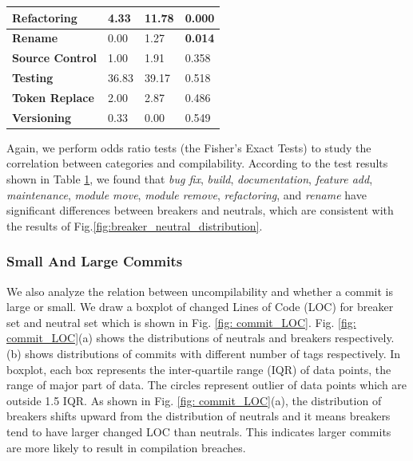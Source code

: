 \begin{table}[htbp]
\begin{tabular}{llll}
      \hline
      \textbf{Refactoring} & 4.33  & 11.78  & \textbf{0.000} \\
      \hline
      \textbf{Rename} & 0.00  & 1.27  & \textbf{0.014} \\
      \hline
      \textbf{Source Control} & 1.00  & 1.91  & 0.358  \\
      \hline
      \textbf{Testing} & 36.83  & 39.17  & 0.518  \\
      \hline
      \textbf{Token Replace} & 2.00  & 2.87  & 0.486  \\
      \hline
      \textbf{Versioning} & 0.33  & 0.00  & 0.549  \\
      \hline
      \end{tabular}%
    \label{tab:breaker_neutral}%
  \end{table}%

Again, we perform odds ratio tests (the Fisher's Exact Tests) to study the correlation between categories and compilability. 
According to the test results shown in Table \ref{tab:breaker_neutral}, we found that \textit{bug fix}, \textit{build}, \textit{documentation}, \textit{feature add}, \textit{maintenance}, \textit{module move}, \textit{module remove}, \textit{refactoring}, and \textit{rename} have significant differences between breaker{}s and neutral{}s, which are consistent with the results of Fig.\ref{fig:breaker_neutral_distribution}.

\subsubsection{Small And Large Commits}

We also analyze the relation between uncompilability and whether a commit is large or small. 
We draw a boxplot of changed Lines of Code (LOC) for breaker set and neutral set which is shown in Fig. \ref{fig: commit_LOC}.
Fig. \ref{fig: commit_LOC}(a) shows the distributions of neutrals and breakers respectively. 
(b) shows distributions of commits with different number of tags respectively. 
In boxplot, each box represents the inter-quartile range (IQR) of data points, the range of major part of data.
The circles represent outlier of data points which are outside 1.5 IQR.
As shown in Fig. \ref{fig: commit_LOC}(a), the distribution of breaker{}s shifts upward from the distribution of neutral{}s and it means breaker{}s tend to have larger changed LOC than neutral{}s. 
This indicates larger commits are more likely to result in compilation breaches.


